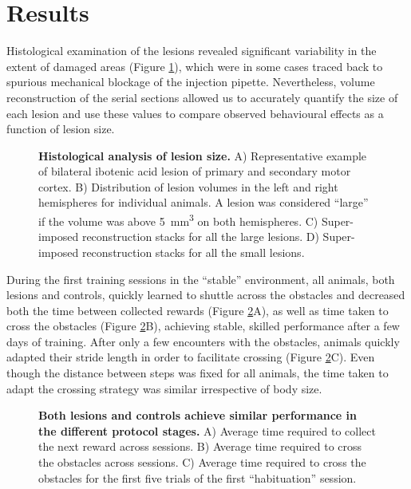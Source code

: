\section{Results}

Histological examination of the lesions revealed significant variability in the extent of damaged areas (Figure \ref{fig:histology}), which were in some cases traced back to spurious mechanical blockage of the injection pipette. Nevertheless, volume reconstruction of the serial sections allowed us to accurately quantify the size of each lesion and use these values to compare observed behavioural effects as a function of lesion size.

\begin{figure}
\centering

\caption{\textbf{Histological analysis of lesion size.} A) Representative example of bilateral ibotenic acid lesion of primary and secondary motor cortex. B) Distribution of lesion volumes in the left and right hemispheres for individual animals. A lesion was considered ``large'' if the volume was above \SI{5}{\milli\meter\cubed} on both hemispheres. C) Super-imposed reconstruction stacks for all the large lesions. D) Super-imposed reconstruction stacks for all the small lesions.}
\label{fig:histology}
\end{figure}

During the first training sessions in the ``stable'' environment, all animals, both lesions and controls, quickly learned to shuttle across the obstacles and decreased both the time between collected rewards (Figure \ref{fig:learning}A), as well as time taken to cross the obstacles (Figure \ref{fig:learning}B), achieving stable, skilled performance after a few days of training. After only a few encounters with the obstacles, animals quickly adapted their stride length in order to facilitate crossing (Figure \ref{fig:learning}C). Even though the distance between steps was fixed for all animals, the time taken to adapt the crossing strategy was similar irrespective of body size.

\begin{figure}
\centering

\caption{\textbf{Both lesions and controls achieve similar performance in the different protocol stages.} A) Average time required to collect the next reward across sessions. B) Average time required to cross the obstacles across sessions. C) Average time required to cross the obstacles for the first five trials of the first ``habituation'' session.}
\label{fig:learning}
\end{figure}

